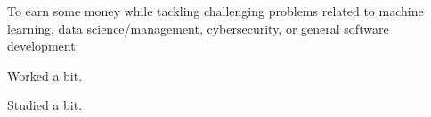 \documentclass[12pt]{resume}
\begin{document}

    \begin{fullwidth}
    \makeheader
    \end{fullwidth}
    
    \sffamily

    To earn some money while tackling challenging problems related to machine learning, data science/management, 
    cybersecurity, or general software development.

    Worked a bit.
    

    Studied a bit.
\end{document}
